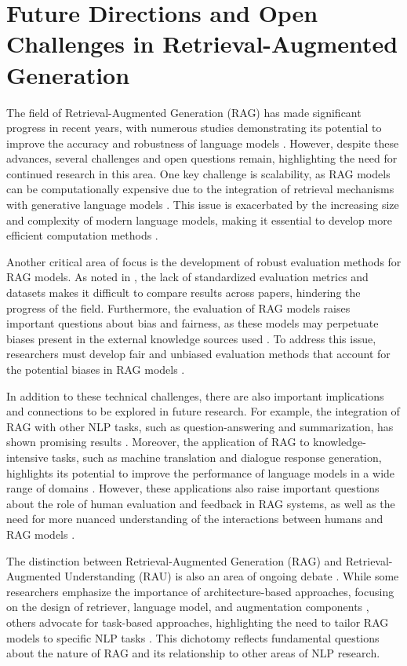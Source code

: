 \documentclass[conference]{IEEEtran}
\begin{document}
\section{Future Directions and Open Challenges in Retrieval-Augmented Generation}
The field of Retrieval-Augmented Generation (RAG) has made significant progress in recent years, with numerous studies demonstrating its potential to improve the accuracy and robustness of language models \cite{b1}. However, despite these advances, several challenges and open questions remain, highlighting the need for continued research in this area. One key challenge is scalability, as RAG models can be computationally expensive due to the integration of retrieval mechanisms with generative language models \cite{b2}. This issue is exacerbated by the increasing size and complexity of modern language models, making it essential to develop more efficient computation methods \cite{b3}.

Another critical area of focus is the development of robust evaluation methods for RAG models. As noted in \cite{b4}, the lack of standardized evaluation metrics and datasets makes it difficult to compare results across papers, hindering the progress of the field. Furthermore, the evaluation of RAG models raises important questions about bias and fairness, as these models may perpetuate biases present in the external knowledge sources used \cite{b5}. To address this issue, researchers must develop fair and unbiased evaluation methods that account for the potential biases in RAG models \cite{b6}.

In addition to these technical challenges, there are also important implications and connections to be explored in future research. For example, the integration of RAG with other NLP tasks, such as question-answering and summarization, has shown promising results \cite{b7}. Moreover, the application of RAG to knowledge-intensive tasks, such as machine translation and dialogue response generation, highlights its potential to improve the performance of language models in a wide range of domains \cite{b8}. However, these applications also raise important questions about the role of human evaluation and feedback in RAG systems, as well as the need for more nuanced understanding of the interactions between humans and RAG models \cite{b9}.

The distinction between Retrieval-Augmented Generation (RAG) and Retrieval-Augmented Understanding (RAU) is also an area of ongoing debate \cite{b10}. While some researchers emphasize the importance of architecture-based approaches, focusing on the design of retriever, language model, and augmentation components \cite{b11}, others advocate for task-based approaches, highlighting the need to tailor RAG models to specific NLP tasks \cite{b12}. This dichotomy reflects fundamental questions about the nature of RAG and its relationship to other areas of NLP research.
\end{document}
